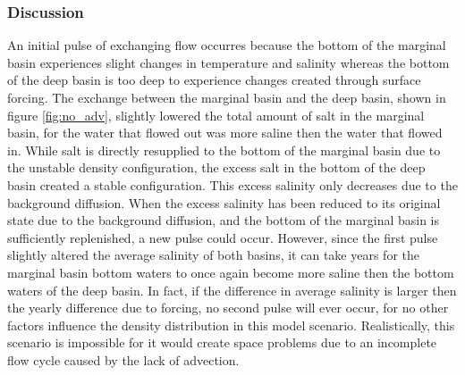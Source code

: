 \documentclass[twocolumn]{article}
\begin{document}
\subsubsection{Discussion}
An initial pulse of exchanging flow occurres because the bottom of the marginal basin experiences slight changes in temperature and salinity whereas the bottom of the deep basin is too deep to experience changes created through surface forcing. The exchange between the marginal basin and the deep basin, shown in figure \ref{fig:no_adv}, slightly lowered the total amount of salt in the marginal basin, for the water that flowed out was more saline then the water that flowed in. While salt is directly resupplied to the bottom of the marginal basin due to the unstable density configuration, the excess salt in the bottom of the deep basin created a stable configuration. This excess salinity only decreases due to the background diffusion. When the excess salinity has been reduced to its original state due to the background diffusion, and the bottom of the marginal basin is sufficiently replenished, a new pulse could occur. However, since the first pulse slightly altered the average salinity of both basins, it can take years for the marginal basin bottom waters to once again become more saline then the bottom waters of the deep basin. In fact, if the difference in average salinity is larger then the yearly difference due to forcing, no second pulse will ever occur, for no other factors influence the density distribution in this model scenario. Realistically, this scenario is impossible for it would create space problems due to an incomplete flow cycle caused by the lack of advection.
\end{document}
